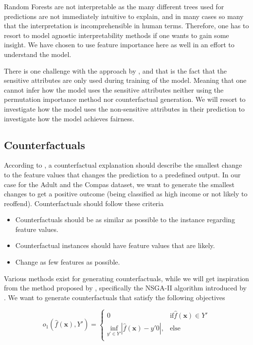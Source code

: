 Random Forests are not interpretable as the many different trees used for predictions are not immediately intuitive to explain, and in many cases so many that the interpretation is incomprehensible in human terms. Therefore, one has to resort to model agnostic interpretability methods if one wants to gain some insight. We have chosen to use feature importance here as well in an effort to understand the model.

There is one challenge with the approach by \citet{Antonio:2021:arXiv}, and that is the fact that the sensitive attributes are only used during training of the model. Meaning that one cannot infer how the model uses the sensitive attributes neither using the permutation importance method nor counterfactual generation. We will resort to investigate how the model uses the non-sensitive attributes in their prediction to investigate how the model achieves fairness.

\subsection{Counterfactuals}
\label{sec:counterfactuals}

According to \citet{Molnar:2020:Book}, a counterfactual explanation should describe the smallest change to the feature values that changes the prediction to a predefined output. In our case for the Adult and the Compas dataset, we want to generate the smallest changes to get a positive outcome (being classified as high income or not likely to reoffend). Counterfactuals should follow these criteria

\begin{itemize}
    \item Counterfactuals should be as similar as possible to the instance regarding feature values.
    \item Counterfactual instances should have feature values that are likely.
    \item Change as few features as possible.
\end{itemize}

Various methods exist for generating counterfactuals, while we will get inspiration from the method proposed by \citet{Dandl:2020:PPSN}, specifically the NSGA-II algorithm introduced by \citet{Pratap:2002:IEEE.Trans.Evol.Comput.}. We want to generate counterfactuals that satisfy the following objectives 

\begin{equation*}
    o_1(\hat{f}(\boldsymbol{x}), Y') = 
    \begin{cases}
        0 & \text{if} \hat{f}(\boldsymbol{x}) \in Y' \\
        \underset{y' \in Y'}{\text{inf}} |\hat{f}(\boldsymbol{x}) - y'0|, & \text{else} \\
    \end{cases}
\end{equation*}

